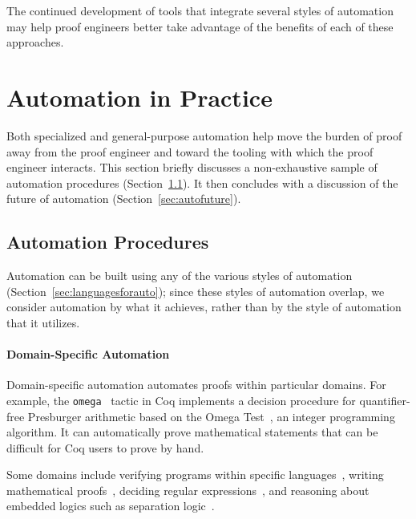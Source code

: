 The continued development of tools that integrate several styles of automation may help
proof engineers better take advantage of the benefits of each of these approaches.


\section{Automation in Practice}
\label{sec:specializedauto}

Both specialized and general-purpose automation help move the burden of proof away from the proof engineer and toward the tooling with which
the proof engineer interacts. This section briefly discusses a non-exhaustive sample of automation procedures (Section~\ref{sec:autotactics}).
It then concludes with a discussion of the future of automation (Section~\ref{sec:autofuture}).

\subsection{Automation Procedures}
\label{sec:autotactics}

Automation can be built using any of the various styles of automation (Section~\ref{sec:languagesforauto});
since these styles of automation overlap, we consider automation by what it achieves,
rather than by the style of automation that it utilizes.

\paragraph{Domain-Specific Automation} Domain-specific automation automates
proofs within particular domains. For example, the
\lstinline{omega}~\citep{coq-omega} tactic in Coq implements a decision procedure for quantifier-free Presburger 
arithmetic based on the Omega Test~\citep{Pugh1991}, an integer programming algorithm.
It can automatically prove mathematical statements that can be difficult for Coq users to
prove by hand.

Some domains include verifying programs within specific languages~\citep{cao2015practical,Ricketts2014},
writing mathematical proofs~\citep{nipkow1990, slind1994ac, Braibant2011, narboux2004, gregoire2005, agdasemiring}, 
deciding regular expressions~\citep{braibant2010}, and reasoning about embedded logics
such as separation logic~\citep{appel2006tactics,mccreight2009practical, Krebbers-al:POPL17}.

